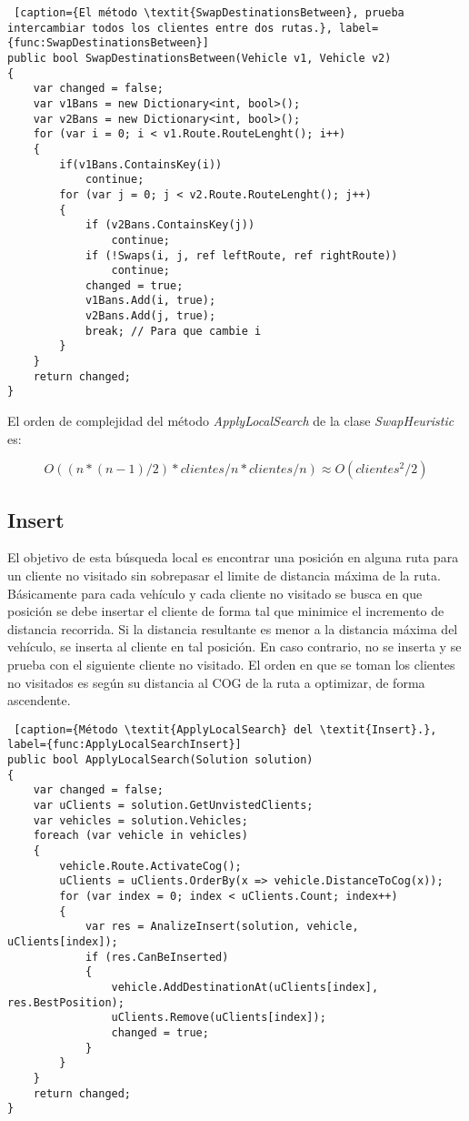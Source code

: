 \begin{minipage}{\textwidth}
\begin{lstlisting} [caption={El método \textit{SwapDestinationsBetween}, prueba intercambiar todos los clientes entre dos rutas.}, label={func:SwapDestinationsBetween}]
public bool SwapDestinationsBetween(Vehicle v1, Vehicle v2)
{
	var changed = false;
	var v1Bans = new Dictionary<int, bool>();
	var v2Bans = new Dictionary<int, bool>();
	for (var i = 0; i < v1.Route.RouteLenght(); i++)
	{
		if(v1Bans.ContainsKey(i)) 
			continue;
		for (var j = 0; j < v2.Route.RouteLenght(); j++)
		{
			if (v2Bans.ContainsKey(j)) 
				continue;
			if (!Swaps(i, j, ref leftRoute, ref rightRoute)) 
				continue;
			changed = true;
			v1Bans.Add(i, true);
			v2Bans.Add(j, true);
			break; // Para que cambie i
		}
	}
	return changed;
}
\end{lstlisting}
\end{minipage}

\bigskip

El orden de complejidad del método \textit{ApplyLocalSearch} de la clase \textit{SwapHeuristic} es:

\begin{equation*}
O((n * (n-1) / 2 ) * clientes/n * clientes/n) \approx O(clientes^2/2)
\end{equation*}

\subsection{Insert}

El objetivo de esta búsqueda local es encontrar una posición en alguna ruta para un cliente no visitado sin sobrepasar el limite de distancia máxima de la ruta. Básicamente para cada vehículo y cada cliente no visitado se busca en que posición se debe insertar el cliente de forma tal que minimice el incremento de distancia recorrida. Si la distancia resultante es menor a la distancia máxima del vehículo, se inserta al cliente en tal posición. En caso contrario, no se inserta y se prueba con el siguiente cliente no visitado. El orden en que se toman los clientes no visitados es según su distancia al COG de la ruta a optimizar, de forma ascendente.

\begin{minipage}{\textwidth}
\begin{lstlisting} [caption={Método \textit{ApplyLocalSearch} del \textit{Insert}.}, label={func:ApplyLocalSearchInsert}]
public bool ApplyLocalSearch(Solution solution)
{
	var changed = false;	
	var uClients = solution.GetUnvistedClients;	
	var vehicles = solution.Vehicles;
	foreach (var vehicle in vehicles)
	{
		vehicle.Route.ActivateCog();
		uClients = uClients.OrderBy(x => vehicle.DistanceToCog(x));	
		for (var index = 0; index < uClients.Count; index++)
		{
			var res = AnalizeInsert(solution, vehicle, uClients[index]);
			if (res.CanBeInserted)
			{
				vehicle.AddDestinationAt(uClients[index], res.BestPosition);
				uClients.Remove(uClients[index]);
				changed = true;
			}
		}
	}
	return changed;
}
\end{lstlisting}
\end{minipage}

